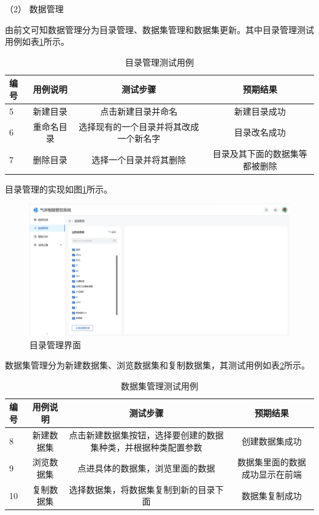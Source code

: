 （2） 数据管理

由前文可知数据管理分为目录管理、数据集管理和数据集更新。其中目录管理测试用例如表\ref{tab:direte}所示。
\begin{table}
    \renewcommand{\arraystretch}{1.5}
    \centering
    \caption{目录管理测试用例}
    \label{tab:direte}
    \begin{tabular}{|l|c|c|c|}
        \hline
        编号 & 用例说明 & 测试步骤 & 预期结果 \\
        \hline
        5 & 新建目录 & 点击新建目录并命名 & 新建目录成功 \\
        \hline 
        6 & 重命名目录 & 选择现有的一个目录并将其改成一个新名字 & 目录改名成功 \\
        \hline
        7 & 删除目录 & 选择一个目录并将其删除 & 目录及其下面的数据集等都被删除 \\
        \hline
    \end{tabular}
\end{table}

目录管理的实现如图\ref{fig:dirre}所示。

\begin{figure}
    \renewcommand{\arraystretch}{1.5}
    \centering
    \includegraphics{figure/目录管理.pdf}
    \caption{目录管理界面}
    \label{fig:dirre}
\end{figure}

数据集管理分为新建数据集、浏览数据集和复制数据集，其测试用例如表\ref{tab:dasette}所示。

\begin{table}
    \renewcommand{\arraystretch}{1.5}
    \centering
    \caption{数据集管理测试用例}
    \label{tab:dasette}
    \begin{tabular}{|l|c|c|c|}
        \hline
        编号 & 用例说明 & 测试步骤 &预期结果 \\
        \hline
        8 & 新建数据集 & 点击新建数据集按钮，选择要创建的数据集种类，并根据种类配置参数 & 创建数据集成功 \\
        \hline
        9 & 浏览数据集 & 点进具体的数据集，浏览里面的数据 & 数据集里面的数据成功显示在前端 \\
        \hline
        10 & 复制数据集 & 选择数据集，将数据集复制到新的目录下面 & 数据集复制成功 \\
        \hline
    \end{tabular}
\end{table}


